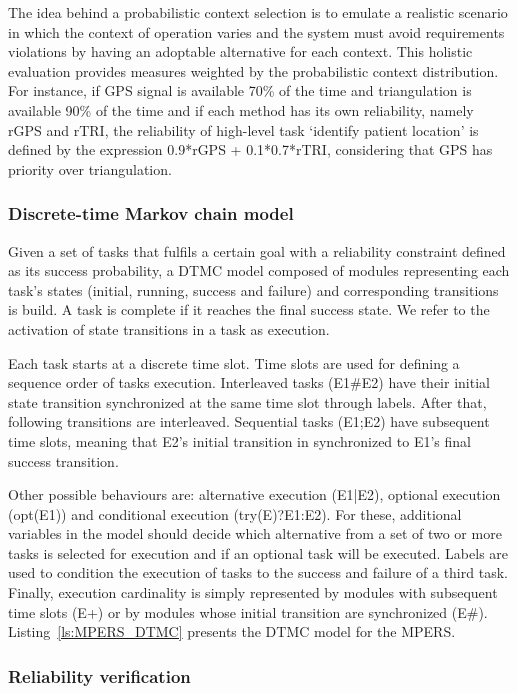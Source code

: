 The idea behind a probabilistic context selection is to emulate a realistic scenario in which the context of operation varies and the system must avoid requirements violations by  having an adoptable alternative for each context. This holistic evaluation provides measures weighted by the probabilistic context distribution. For instance, if GPS signal is available 70\% of the time and triangulation is available 90\% of the time and if each method has its own reliability, namely rGPS and rTRI, the reliability of high-level task `identify patient location' is defined by the expression 0.9*rGPS + 0.1*0.7*rTRI, considering that GPS has priority over triangulation. 


\subsubsection{Discrete-time Markov chain model}

Given a set of tasks that fulfils a certain goal with a reliability constraint defined as its success probability, a DTMC model composed of modules representing each task's states (initial, running, success and failure) and corresponding transitions is build. A task is complete if it reaches the final success state. We refer to the activation of state transitions in a task as execution.

Each task starts at a discrete time slot. Time slots are used for defining a sequence order of tasks execution. Interleaved tasks (E1\#E2) have their initial state transition synchronized at the same time slot through labels. After that, following transitions are interleaved. Sequential tasks (E1;E2) have subsequent time slots, meaning that E2's initial transition in synchronized to E1's final success transition.

Other possible behaviours are: alternative execution (E1|E2), optional execution (opt(E1)) and conditional execution (try(E)?E1:E2). For these, additional variables in the model should decide which alternative from a set of two or more tasks is selected for execution and if an optional task will be executed. Labels are used to condition the execution of tasks to the success and failure of a third task. Finally, execution cardinality is simply represented by modules with subsequent time slots (E+) or by modules whose initial transition are synchronized (E\#). Listing~\ref{ls:MPERS_DTMC} presents the DTMC model for the MPERS.

\subsubsection{Reliability verification}

